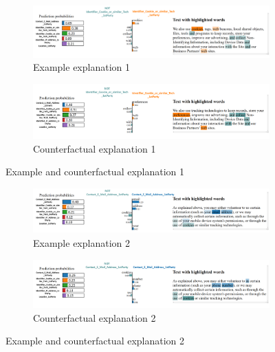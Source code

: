 \begin{figure}[!ht]
    \begin{subfigure}[b]{1\textwidth}
      \centering
      \includegraphics[width=1\linewidth]{figures/explanations_visualisations/counterfactual/3.2.png}
      \caption{Example explanation 1}
    \end{subfigure}
    \hfill
    \begin{subfigure}[b]{1\textwidth}
      \centering
      \includegraphics[width=1\linewidth]{figures/explanations_visualisations/counterfactual/3_2_counterfactual.png}
      \caption{Counterfactual explanation 1}
    \end{subfigure}
    \caption{Example and counterfactual explanation 1}
    \label{fig:part3_counterfactuals_example_1}
\end{figure}

\begin{figure}[!ht]
    \begin{subfigure}[b]{1\textwidth}
      \centering
      \includegraphics[width=1\linewidth]{figures/explanations_visualisations/counterfactual/3.3.png}
      \caption{Example explanation 2}
    \end{subfigure}
    \hfill
    \begin{subfigure}[b]{1\textwidth}
      \centering
      \includegraphics[width=1\linewidth]{figures/explanations_visualisations/counterfactual/3_3_counterfactual.png}
      \caption{Counterfactual explanation 2}
    \end{subfigure}
    \caption{Example and counterfactual explanation 2}
    \label{fig:part3_counterfactuals_example_2}
\end{figure}

